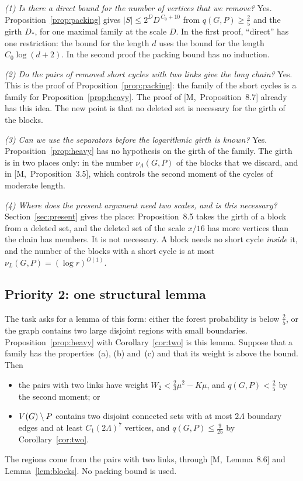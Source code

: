 \documentclass[11pt]{article}
\newcommand{\M}[1]{[M,~#1]}
\begin{document}
\emph{(1) Is there a direct bound for the number of vertices that we remove?} Yes.
Proposition~\ref{prop:packing} gives $|S|\le2^{D}D^{\,C_0+10}$ from $q(G,P)\ge\frac25$ and the
girth $D_*$, for one maximal family at the scale $D$. In the first proof, ``direct'' has one
restriction: the bound for the length $d$ uses the bound for the length $C_0\log(d+2)$. In the
second proof the packing bound has no induction.

\emph{(2) Do the pairs of removed short cycles with two links give the long chain?} Yes. This is
the proof of Proposition~\ref{prop:packing}: the family of the short cycles is a family for
Proposition~\ref{prop:heavy}. The proof of \M{Proposition~8.7} already has this idea. The new
point is that no deleted set is necessary for the girth of the blocks.

\emph{(3) Can we use the separators before the logarithmic girth is known?} Yes.
Proposition~\ref{prop:heavy} has no hypothesis on the girth of the family. The girth is in two
places only: in the number $\nu_\Lambda(G,P)$ of the blocks that we discard, and in
\M{Proposition~3.5}, which controls the second moment of the cycles of moderate length.

\emph{(4) Where does the present argument need two scales, and is this necessary?}
Section~\ref{sec:present} gives the place: Proposition~8.5 takes the girth of a block from a
deleted set, and the deleted set of the scale $x/16$ has more vertices than the chain has members.
It is not necessary. A block needs no short cycle \emph{inside} it, and the number of the blocks
with a short cycle is at most $\nu_L(G,P)=(\log r)^{O(1)}$.

\subsection{Priority 2: one structural lemma}

The task asks for a lemma of this form: either the forest probability is below $\frac25$, or the
graph contains two large disjoint regions with small boundaries. Proposition~\ref{prop:heavy}
with Corollary~\ref{cor:two} is this lemma. Suppose that a family has the properties~(a), (b)
and~(c) and that its weight is above the bound. Then
\begin{itemize}[leftmargin=1.2em]
\item the pairs with two links have weight $W_2<\frac23\mu^{2}-K\mu$, and
$q(G,P)<\frac25$ by the second moment; or
\item $V(G)\setminus P$ contains two disjoint connected sets with at most $2\Lambda$ boundary edges and
at least $C_1(2\Lambda)^{7}$ vertices, and $q(G,P)\le\frac9{25}$ by Corollary~\ref{cor:two}.
\end{itemize}
The regions come from the pairs with two links, through \M{Lemma~8.6} and
Lemma~\ref{lem:blocks}. No packing bound is used.
\end{document}
